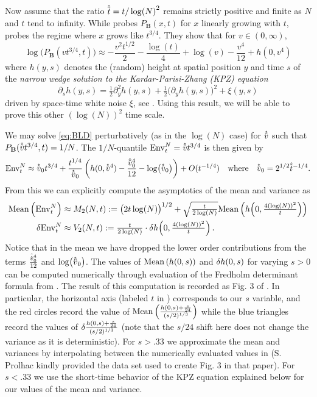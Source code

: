 \medskip
Now assume that the ratio $\hathat{t} = t/\log (N)^2$ remains strictly positive and finite as $N$ and $t$ tend to infinity.
While \cite{barraquand_random-walk_2017} probes $P_{\mathbf{B}}(x,t)$ for $x$ linearly growing with $t$, \cite{barraquand_moderate_2020} probes the regime where $x$ grows like $t^{3/4}$. They show that for $v\in (0,\infty)$,
\begin{equation}\label{eq:BLD}
\log\big(P_{\mathbf{B}}(v t^{3/4},t)\big)\approx  -\frac{v^2 t^{1/2}}{2} - \frac{\log(t)}{4} + \log(v) - \frac{v^4}{12}+ h(0,v^4)
\end{equation}
where $h(y,s)$ denotes the (random) height at spatial position $y$ and time $s$ of the {\it narrow wedge solution to the Kardar-Parisi-Zhang (KPZ) equation}
$$\partial_s h(y,s) = \tfrac{1}{2}\partial_y^2 h(y,s) + \tfrac{1}{2} \big(\partial_y h(y,s)\big)^2 +  \xi(y,s)$$
driven by space-time white noise $\xi$, see \cite{kardar_dynamic_1986, corwin_kardar_2012}. Using this result, we will be able to prove this other $(\log(N))^2$ time scale.

We may solve  \eqref{eq:BLD} perturbatively (as in the $\log(N)$ case) for $\hathat{v}$ such that $P_{\mathbf{B}}(\hathat{v}t^{3/4},t)= 1/N$. The $1/N$-quantile $\envnt=\hathat{v}t^{3/4}$ is then given by
$$
\envnt \approx \hathat{v}_0 t^{3/4} + \frac{t^{1/4}}{\hathat{v}_0}\left(h(0,\hathat{v}^4) - \frac{\hathat{v}_0^4}{12} -\log(\hathat{v}_0)\right) + O(t^{-1/4})\quad\textrm{where}\quad \hathat{v}_0 = 2^{1/2}\hathat{t}^{-1/4}.
$$
From this we can explicitly compute the asymptotics of the mean and variance as
\begin{align}\label{eq:var_longtime}
\nonumber \mathrm{Mean}\left(\mathrm{Env}^{N}_t\right) &\approx M_2(N,t):=  \big(2 t\log(N)\big)^{1/2} +\sqrt{\tfrac{t}{2\log(N)}}\mathrm{Mean}\left(h\Big(0,\tfrac{4 (\log(N))^2}{t}\Big)\right)\\
\var{\mathrm{Env}^{N}_t} &\approx V_2(N,t):= \tfrac{t}{2\log(N)} \cdot \var{h\Big(0,\tfrac{4 (\log(N))^2}{t}\Big)}.
\end{align}
Notice that in the mean we have dropped the lower order contributions from the terms $\frac{\hathat{v}_0^4}{12}$ and $\log(\hathat{v}_0)$.
The values of $\mathrm{Mean}\left(h(0,s)\right)$ and $\var{h(0,s)}$ for varying $s>0$ can be computed numerically through evaluation of the Fredholm determinant formula from \cite{sasamoto_one-dimensional_2010,calabrese_free-energy_2010,dotsenko_bethe_2010,amir_probability_2011}.
The result of this computation is recorded as Fig. 3 of \cite{prolhac_height_2011}. In particular, the horizontal axis (labeled $t$ in  \cite{prolhac_height_2011}) corresponds to our $s$ variable, and the red circles record the value of $\mathrm{Mean}\left(\frac{h(0,s)+\frac{s}{24}}{(s/2)^{1/3}}\right)$ while the blue triangles record the values of $\var{\frac{h(0,s)+\frac{s}{24}}{(s/2)^{1/3}}}$ (note that the $s/24$ shift here does not change the variance as it is deterministic). For $s>.33$ we approximate the mean and variances by interpolating between the numerically evaluated values in \cite{prolhac_height_2011} (S. Prolhac kindly provided the data set used to create Fig. 3 in that paper). For $s<.33$ we use the short-time behavior of the KPZ equation explained below for our values of the mean and variance.

